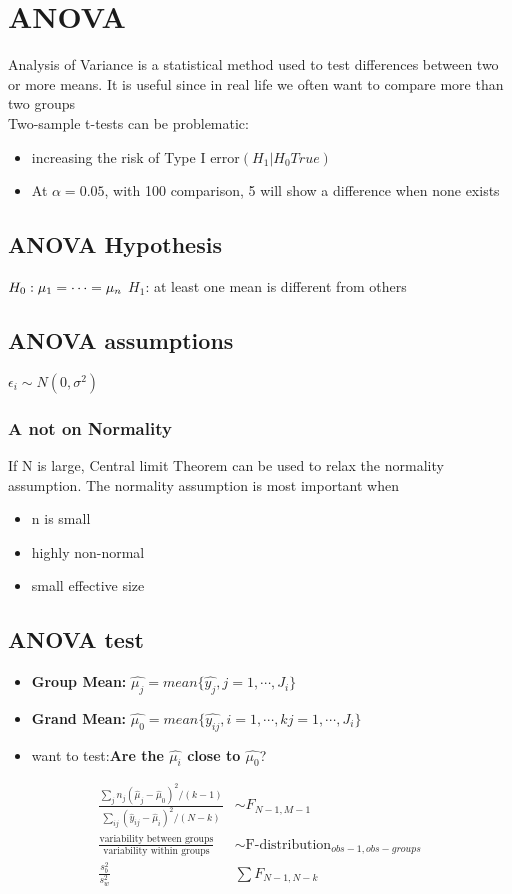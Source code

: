 \documentclass{article}
\theoremstyle{definition}
\theoremstyle{thrm}
\theoremstyle{lma}
\theoremstyle{ppst}
\theoremstyle{crlr}
\begin{document}
\section{ANOVA}
Analysis of Variance is a statistical method used to test differences between two or more means. It is useful since in real life we often want to compare more than two groups\\
Two-sample t-tests can be problematic:
\begin{itemize}
	\item increasing the risk of Type I error$(H_1|H_0 True)$
	\item At $\alpha = 0.05$, with 100 comparison, 5 will show a difference when none exists
\end{itemize}

\subsection{ANOVA Hypothesis}
$H_0: \mu_1 = \cdots = \mu_n\\$
$H_1$: at least one mean is different from others

\subsection{ANOVA assumptions}
$\epsilon_i \sim N(0,\sigma^2)$

\subsubsection{A not on Normality}
If N is large, Central limit Theorem can be used to relax the normality assumption.
The normality assumption is most important when
\begin{itemize}
	\item n is small
	\item highly non-normal
	\item small effective size
\end{itemize}

\subsection{ANOVA test}
\begin{itemize}
	\item \textbf{Group Mean: }$\hat{\mu_j} = mean\{\hat{y_j}, j = 1,\cdots,J_i\}$
	\item \textbf{Grand Mean: }$\hat{\mu_0} = mean\{\hat{y_{ij}},i = 1,\cdots,k j = 1,\cdots,J_i\}$
	\item want to test:\textbf{Are the $\hat{\mu_i}$ close to $\hat{\mu_0}$}?
\end{itemize}
\begin{align*}
	\frac{\sum_j n_j(\hat{\mu}_j-\hat{\mu}_0)^2/(k-1)}{\sum_{ij}(\hat{y}_{ij}-\hat{\mu}_i)^2/(N-k)}&\sim F_{N-1, M-1}\\
	\frac{\text{variability between groups}}{\text{variability within groups}} &\sim \text{F-distribution}_{obs-1, obs-groups}\\
	\frac{s_b^2}{s_w^2} &\sum F_{N-1,N-k}
\end{align*}
\end{document}
